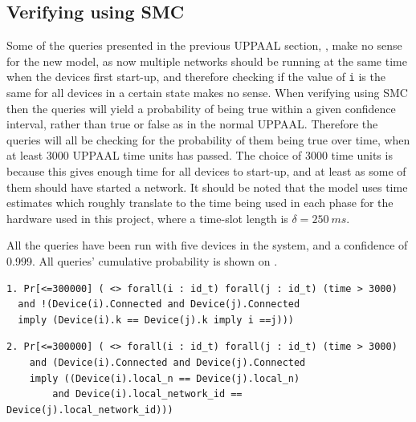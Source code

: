 
\subsection*{Verifying using SMC}

Some of the queries presented in the previous UPPAAL section, , make no sense for the new model, as now multiple networks should be running at the same time when the devices first start-up, and therefore checking if the value of \texttt{i} is the same for all devices in a certain state makes no sense.
When verifying using SMC then the queries will yield a probability of being true within a given confidence interval, rather than true or false as in the normal UPPAAL.
Therefore the queries will all be checking for the probability of them being true over time, when at least 3000 UPPAAL time units has passed.
The choice of 3000 time units is because this gives enough time for all devices to start-up, and at least as some of them should have started a network. 
It should be noted that the model uses time estimates which roughly translate to the time being used in each phase for the hardware used in this project, where a time-slot length is $\delta = 250\ ms$.

All the queries have been run with five devices in the system, and a confidence of 0.999.
All queries' cumulative probability is shown on .

\begin{lstlisting}[style=UPPAAL, title={This query asks for the probability that it is false that two devices which are connected have the same k, only if they are the same device. When run with a confidence of 99.9\% this query will within 3797 runs result in [0, 0.00199982], the query takes 799 seconds on the same laptop used in \myref{sec:verifyingTheModel}.}]
1. Pr[<=300000] ( <> forall(i : id_t) forall(j : id_t) (time > 3000)
  and !(Device(i).Connected and Device(j).Connected
  imply (Device(i).k == Device(j).k imply i ==j)))
\end{lstlisting}

\begin{lstlisting}[style=UPPAAL, title={This query asks after 3000 UPPAAL time units has passed, what then is the probability that if two devices \texttt{i}, and \texttt{j} are connected to a network that their local values of \texttt{n} are the same, and that they are both connected to the same network. This means that the devices are connected to the same network. UPPAAL runs this query and within 3451 runs [0.998,1] with confidence 99.9 \% this is true. The query had a run-time of 46 seconds. }]
2. Pr[<=300000] ( <> forall(i : id_t) forall(j : id_t) (time > 3000) 
    and (Device(i).Connected and Device(j).Connected 
    imply ((Device(i).local_n == Device(j).local_n)
        and Device(i).local_network_id == Device(j).local_network_id)))     
\end{lstlisting}

